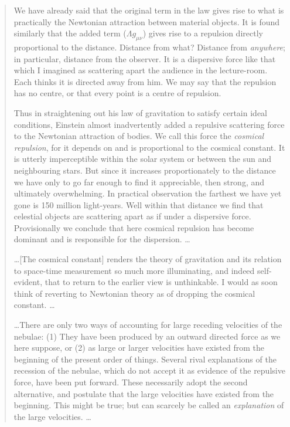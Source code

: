 \begin{quotation}
We have already said that the original term in the law gives rise to what is practically the Newtonian attraction between material objects. It is found similarly that the added term ($\Lambda{g_{\mu\nu}}$) gives rise to a repulsion directly proportional to the distance. Distance from what? Distance from \textit{anywhere}; in particular, distance from the observer. It is a dispersive force like that which I imagined as scattering apart the audience in the lecture-room. Each thinks it is directed away from him. We may say that the repulsion has no centre, or that every point is a centre of repulsion.

Thus in straightening out his law of gravitation to satisfy certain ideal conditions, Einstein almost inadvertently added a repulsive scattering force to the Newtonian attraction of bodies. We call this force the \textit{cosmical repulsion}, for it depends on and is proportional to the cosmical constant. It is utterly imperceptible within the solar system or between the sun and neighbouring stars. But since it increases proportionately to the distance we have only to go far enough to find it appreciable, then strong, and ultimately overwhelming. In practical observation the farthest we have yet gone is 150 million light-years. Well within that distance we find that celestial objects are scattering apart as if under a dispersive force. Provisionally we conclude that here cosmical repulsion has become dominant and is responsible for the dispersion. \ldots

\ldots [The cosmical constant] renders the theory of gravitation and its relation to space-time measurement so much more illuminating, and indeed self-evident, that to return to the earlier view is unthinkable. I would as soon think of reverting to Newtonian theory as of dropping the cosmical constant. \ldots

\ldots There are only two ways of accounting for large receding velocities of the nebulae: (1) They have been produced by an outward directed force as we here suppose, or (2) as large or larger velocities have existed from the beginning of the present order of things. Several rival explanations of the recession of the nebulae, which do not accept it as evidence of the repulsive force, have been put forward. These necessarily adopt the second alternative, and postulate that the large velocities have existed from the beginning. This might be true; but can scarcely be called an \textit{explanation} of the large velocities. \ldots


\end{quotation}
